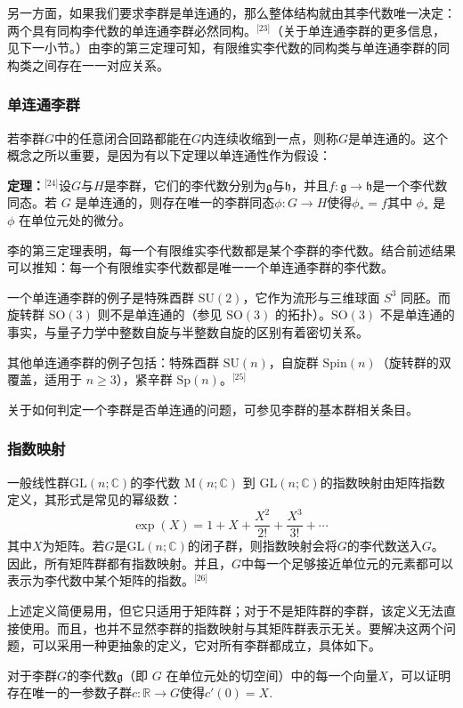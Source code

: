 另一方面，如果我们要求李群是单连通的，那么整体结构就由其李代数唯一决定：两个具有同构李代数的单连通李群必然同构。\(^\text{[23]}\)（关于单连通李群的更多信息，见下一小节。）由李的第三定理可知，有限维实李代数的同构类与单连通李群的同构类之间存在一一对应关系。
\subsubsection{单连通李群}
若李群$G$中的任意闭合回路都能在$G$内连续收缩到一点，则称$G$是单连通的。这个概念之所以重要，是因为有以下定理以单连通性作为假设：

\textbf{定理：\(^\text{[24]}\)}设$G$与$H$是李群，它们的李代数分别为$\mathfrak{g}$与$\mathfrak{h}$，并且$f : \mathfrak{g} \to \mathfrak{h}$是一个李代数同态。若 $G$ 是单连通的，则存在唯一的李群同态$\phi : G \to H$使得$\phi_{*} = f$其中 $\phi_{*}$ 是 $\phi$ 在单位元处的微分。

李的第三定理表明，每一个有限维实李代数都是某个李群的李代数。结合前述结果可以推知：每一个有限维实李代数都是唯一一个单连通李群的李代数。

一个单连通李群的例子是特殊酉群 $\mathrm{SU}(2)$，它作为流形与三维球面 $S^{3}$ 同胚。而旋转群 $\mathrm{SO}(3)$ 则不是单连通的（参见 $\mathrm{SO}(3)$ 的拓扑）。$\mathrm{SO}(3)$ 不是单连通的事实，与量子力学中整数自旋与半整数自旋的区别有着密切关系。

其他单连通李群的例子包括：特殊酉群 $\mathrm{SU}(n)$，自旋群 $\mathrm{Spin}(n)$（旋转群的双覆盖，适用于 $n \geq 3$），紧辛群 $\mathrm{Sp}(n)$。\(^\text{[25]}\)

关于如何判定一个李群是否单连通的问题，可参见李群的基本群相关条目。
\subsubsection{指数映射}
一般线性群$\mathrm{GL}(n;\mathbb{C})$的李代数 $\mathrm{M}(n;\mathbb{C})$ 到 $\mathrm{GL}(n;\mathbb{C})$的指数映射由矩阵指数定义，其形式是常见的幂级数：
$$
\exp(X) = 1 + X + \frac{X^2}{2!} + \frac{X^3}{3!} + \cdots~
$$
其中$X$为矩阵。若$G$是$\mathrm{GL}(n;\mathbb{C})$的闭子群，则指数映射会将$G$的李代数送入$G$。因此，所有矩阵群都有指数映射。并且，$G$中每一个足够接近单位元的元素都可以表示为李代数中某个矩阵的指数。\(^\text{[26]}\)

上述定义简便易用，但它只适用于矩阵群；对于不是矩阵群的李群，该定义无法直接使用。而且，也并不显然李群的指数映射与其矩阵群表示无关。要解决这两个问题，可以采用一种更抽象的定义，它对所有李群都成立，具体如下。

对于李群$G$的李代数$\mathfrak{g}$（即 $G$ 在单位元处的切空间）中的每一个向量$X$，可以证明存在唯一的一参数子群$c : \mathbb{R} \to G$使得$c'(0) = X$.

